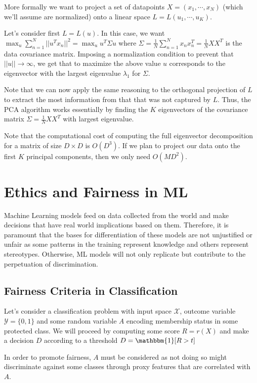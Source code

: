 \documentclass{article}
\newcommand{\ind}{\mathbbm{1}}
\begin{document}
More formally we want to project a set of datapoints $X = (x_1, \cdots, x_N)$ (which we'll assume are normalized) onto a linear space $L = L(u_1, \cdots, u_K)$.

Let's consider first $L = L(u)$. 
In this case, we want $\max_u \sum_{n=1}^N ||u^T x_n||^2 = \max_u u^T \Sigma u$ where $\Sigma = \frac{1}{N} \sum_{n=1}^N x_n x_n^T = \frac{1}{N} X X^T$ is the data covariance matrix.
Imposing a normalization condition to prevent that $||u|| \to \infty$, we get that to maximize the above value $u$ corresponds to the eigenvector with the largest eigenvalue $\lambda_1$ for $\Sigma$.

Note that we can now apply the same reasoning to the orthogonal projection of $L$ to extract the most information from that that was not captured by $L$.
Thus, the PCA algorithm works essentially by finding the $K$ eigenvectors of the covariance matrix $\Sigma = \frac{1}{N} X X^T$ with largest eigenvalue.

Note that the computational cost of computing the full eigenvector decomposition for a matrix of size $D \times D$ is $O(D^3)$.
If we plan to project our data onto the first $K$ principal components, then we only need $O(M D^2)$.

\section{Ethics and Fairness in ML}

Machine Learning models feed on data collected from the world and make decisions that have real world implications based on them.
Therefore, it is paramount that the bases for differentiation of these models are not unjustified or unfair as some patterns in the training represent knowledge and others represent stereotypes.
Otherwise, ML models will not only replicate but contribute to the perpetuation of discrimination.

\subsection{Fairness Criteria in Classification}

Let's consider a classification problem with input space $\mathcal{X}$, outcome variable $\mathcal{Y} = \{0,1\}$ and some random variable $A$ encoding membership status in some protected class.
We will proceed by computing some score $R = r(X)$ and make a decision $D$ according to a threshold $D = \ind[R>t]$

In order to promote fairness, $A$ must be considered as not doing so might discriminate against some classes through proxy features that are correlated with $A$.
\end{document}
